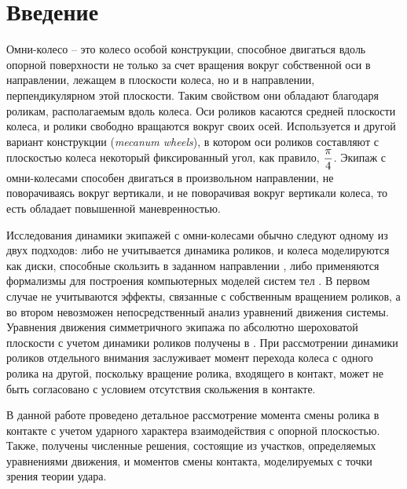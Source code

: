 
\section{Введение}

Омни-колесо -- это колесо особой конструкции, способное двигаться вдоль опорной поверхности не только за счет вращения вокруг собственной оси в направлении, лежащем в плоскости колеса, но и в направлении, перпендикулярном этой плоскости. Таким свойством они обладают благодаря роликам, располагаемым вдоль колеса. Оси роликов касаются средней плоскости колеса, и ролики свободно вращаются вокруг своих осей. Используется и другой вариант конструкции (\textit{mecanum wheels}), в котором оси роликов составляют с плоскостью колеса некоторый фиксированный угол, как правило, $\displaystyle\frac{\displaystyle \pi}{\displaystyle 4}$. Экипаж с омни-колесами способен двигаться в произвольном направлении, не поворачиваясь вокруг вертикали, и не поворачивая вокруг вертикали колеса, то есть обладает повышенной маневренностью.

Исследования динамики экипажей с омни-колесами обычно следуют одному из двух подходов: либо не учитывается динамика роликов, и колеса моделируются как диски, способные скользить в заданном направлении \cite{ZobovaTatarinovPMM, formalskii, borisov, ZobovaTatarinovAspecty2006, zobova2008svobodnye8020851, Martynenko2010}, либо применяются формализмы для построения компьютерных моделей систем тел \cite{KosenkoGerasimov, Tobolar, Williams2002, Ashmore2002}. В первом случае не учитываются эффекты, связанные с собственным вращением роликов, а во втором невозможен непосредственный анализ уравнений движения системы. Уравнения движения симметричного экипажа по абсолютно шероховатой плоскости с учетом динамики роликов получены в \cite{ZobovaGerasimovPMM}. При рассмотрении динамики роликов отдельного внимания заслуживает момент перехода колеса с одного ролика на другой, поскольку вращение ролика, входящего в контакт, может не быть согласовано с условием отсутствия скольжения в контакте.

В данной работе проведено детальное рассмотрение момента смены ролика в контакте с учетом ударного характера взаимодействия с опорной плоскостью. Также, получены численные решения, состоящие из участков, определяемых уравнениями движения, и моментов смены контакта, моделируемых с точки зрения теории удара.